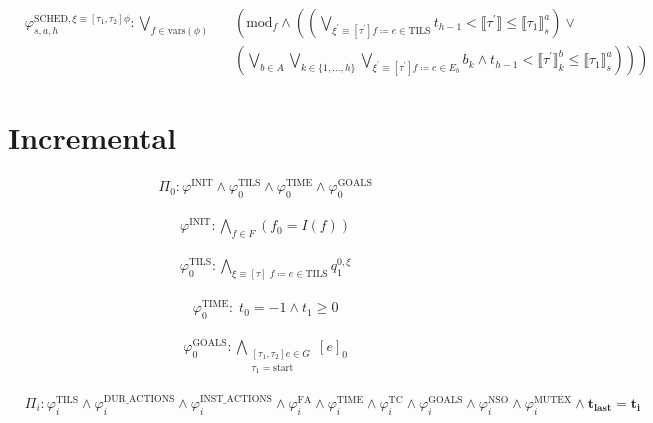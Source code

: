 \documentclass{article}
\begin{document}
\begin{align*}
  &\varphi_{s, a, h}^{\text{SCHED}, \xi \equiv [\tau_1, \tau_2] \phi}: \bigvee\limits_{f \in \text{vars}(\phi)} &&\left( \text{mod}_f \land \left( \left( \bigvee\limits_{\xi^\prime \equiv [\tau^\prime] f \coloneqq e \in \text{TILS}} t_{h-1} < \llbracket \tau^\prime \rrbracket \leq \llbracket \tau_1 \rrbracket_s^a \right) \lor \right. \right.\\
  & &&\left. \left. \left( \bigvee\limits_{b \in A} \bigvee\limits_{k \in \{ 1, \ldots, h \}} \bigvee\limits_{\xi^\prime \equiv [\tau^\prime] f \coloneqq e \in E_b} b_k \land t_{h-1} < \llbracket \tau^\prime \rrbracket_k^b \leq \llbracket \tau_1 \rrbracket_s^a \right) \right) \right)
\end{align*}

\section{Incremental}

\begin{align*}
  &\Pi_0: \varphi^{\text{INIT}} \land \varphi_{0}^{\text{TILS}} \land \varphi_{0}^{\text{TIME}} \land \varphi_{0}^{\text{GOALS}}
\end{align*}

\begin{align*}
  &\varphi^{\text{INIT}}: \bigwedge\limits_{f \in F} \left( f_{0} = I(f) \right)
\end{align*}

\begin{align*}
  &\varphi_0^{\text{TILS}}: \bigwedge\limits_{\xi \equiv [\tau] \; f \coloneqq e \in \text{TILS}} q_1^{0, \xi}
\end{align*}

\begin{align*}
  &\varphi_{0}^{\text{TIME}}: \; t_0 = -1 \land t_1 \geq 0
\end{align*}

\begin{align*}
    &\varphi_0^\text{GOALS}: \bigwedge\limits_{\substack{[\tau_1, \tau_2] e \in G\\ \tau_1 = \text{start}}} [e]_0
\end{align*}

\begin{align*}
    &\Pi_i: \varphi_{i}^{\text{TILS}} \land \varphi_{i}^{\text{DUR\_ACTIONS}} \land \varphi_{i}^{\text{INST\_ACTIONS}} \land \varphi_{i}^{\text{FA}} \land \varphi_{i}^{\text{TIME}} \land \varphi_{i}^{\text{TC}} \land \varphi_{i}^{\text{GOALS}} \land \varphi_{i}^\text{NSO} \land \varphi_i^\text{MUTEX} \land \boldsymbol{t_{\text{last}} = t_i}
\end{align*}
\end{document}
